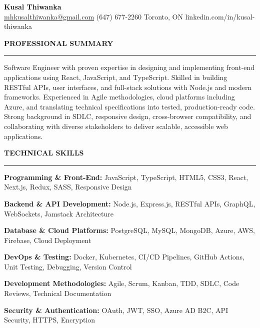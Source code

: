 \documentclass[10pt,letterpaper]{article}
\begin{document}
\begin{center}
{\LARGE\textbf{Kusal Thiwanka}}\\[3pt]
\href{mailto:mhkusalthiwanka@gmail.com}{mhkusalthiwanka@gmail.com}\hspace{2em}%
(647) 677{-}2260\hspace{2em}%
Toronto, ON\hspace{2em}
linkedin.com/in/kusal-thiwanka
\end{center}

\vspace{6pt}

\textbf{PROFESSIONAL SUMMARY}\\[-8pt]
\noindent\rule{\textwidth}{1pt}

\vspace{-2pt}

Software Engineer with proven expertise in designing and implementing front-end applications using React, JavaScript, and TypeScript. Skilled in building RESTful APIs, user interfaces, and full-stack solutions with Node.js and modern frameworks. Experienced in Agile methodologies, cloud platforms including Azure, and translating technical specifications into tested, production-ready code. Strong background in SDLC, responsive design, cross-browser compatibility, and collaborating with diverse stakeholders to deliver scalable, accessible web applications.

\vspace{8pt}

\textbf{TECHNICAL SKILLS}\\[-8pt]
\noindent\rule{\textwidth}{1pt}

\vspace{-2pt}

\textbf{Programming \& Front-End:} JavaScript, TypeScript, HTML5, CSS3, React, Next.js, Redux, SASS, Responsive Design

\textbf{Backend \& API Development:} Node.js, Express.js, RESTful APIs, GraphQL, WebSockets, Jamstack Architecture

\textbf{Database \& Cloud Platforms:} PostgreSQL, MySQL, MongoDB, Azure, AWS, Firebase, Cloud Deployment

\textbf{DevOps \& Testing:} Docker, Kubernetes, CI/CD Pipelines, GitHub Actions, Unit Testing, Debugging, Version Control

\textbf{Development Methodologies:} Agile, Scrum, Kanban, TDD, SDLC, Code Reviews, Technical Documentation

\textbf{Security \& Authentication:} OAuth, JWT, SSO, Azure AD B2C, API Security, HTTPS, Encryption
\end{document}
